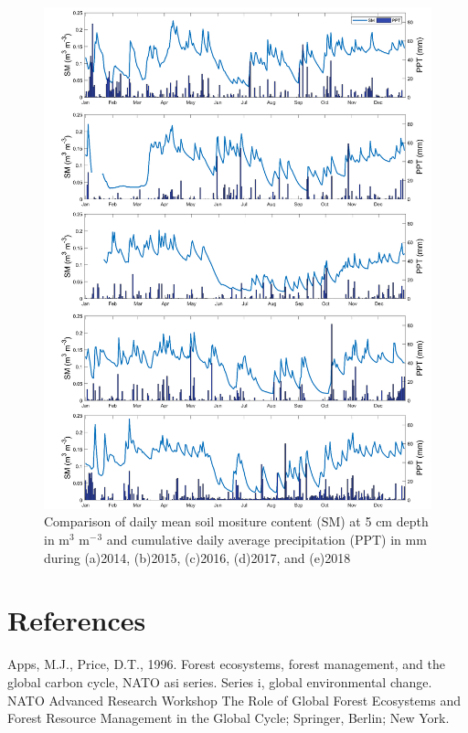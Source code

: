 \documentclass[]{elsarticle} %
\makeatletter
\def\maxwidth{\ifdim\Gin@nat@width>\linewidth\linewidth
\else\Gin@nat@width\fi}
\let\Oldincludegraphics\includegraphics
\renewcommand{\includegraphics}[1]{\Oldincludegraphics[width=\maxwidth]{#1}}
\makeatother
\begin{document}
\begin{figure}
\centering
\includegraphics{../images/static/smPPT.png}
\caption{Comparison of daily mean soil mositure content (SM) at 5 cm
depth in m\(^3\) m\(^-\)\(^3\) and cumulative daily average
precipitation (PPT) in mm during (a)2014, (b)2015, (c)2016, (d)2017, and
(e)2018 \label{fig:smPPT}}
\end{figure}

\pagebreak

\hypertarget{references}{%
\section*{References}\label{references}}

\hypertarget{refs}{}
\leavevmode\hypertarget{ref-Apps.1996}{}%
Apps, M.J., Price, D.T., 1996. Forest ecosystems, forest management, and
the global carbon cycle, NATO asi series. Series i, global environmental
change. NATO Advanced Research Workshop The Role of Global Forest
Ecosystems and Forest Resource Management in the Global Cycle; Springer,
Berlin; New York.
\end{document}
